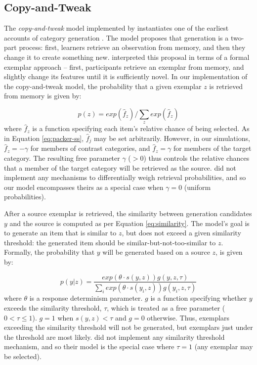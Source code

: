 \documentclass[10pt,letterpaper]{article}
\begin{document}
\subsection{Copy-and-Tweak}

The \textit{copy-and-tweak} model implemented by \citet{jern2013probabilistic} instantiates one of the earliest accounts of category generation \citep[see][]{ward2002role,ward1995s}. The model proposes that generation is a two-part process: first, learners retrieve an observation from memory, and then they change it to create something new. \citet{jern2013probabilistic} interpreted this proposal in terms of a formal exemplar approach -- first, participants retrieve an exemplar from memory, and slightly change its features until it is sufficiently novel. In our implementation of the copy-and-tweak model, the probability that a given exemplar $z$ is retrieved from memory is given by: 

\begin{equation}
p(z) = exp(\hat{f}_z) / \sum_z{ exp(\hat{f}_z) }
\end{equation}
%
where $\hat{f}_z$ is a function specifying each item's relative chance of being selected. As in Equation \ref{eq:packer-ss}, $\hat{f}_j$ may be set arbitrarily. However, in our simulations, $\hat{f}_z = -\gamma$ for members of contrast categories, and $\hat{f}_z = \gamma$ for members of the target category. The resulting free parameter $\gamma$ ($>0$) thus controls the relative chances that a member of the target category will be retrieved as the source. \citet{jern2013probabilistic} did not implement any mechanisms to differentially weigh retrieval probabilities, and so our model encompasses theirs as a special case when $\gamma = 0$ (uniform probabilities).

After a source exemplar is retrieved, the similarity between generation candidates $y$ and the source is computed as per Equation \ref{eq:similarity}. The model's goal is to generate an item that is similar to $z$, but does not exceed a given similarity threshold: the generated item should be similar-but-not-too-similar to $z$. Formally, the probability that $y$ will be generated based on a source $z$, is given by:

\begin{equation}
    p(y|z)  = \dfrac
    { exp(\theta \cdot s(y,z)) g(y,z,\tau)}
    {\sum_i{exp(\theta \cdot s(y_i,z)) g(y_i,z,\tau)}} 
\end{equation}
% 
where $\theta$ is a response determinism parameter. $g$ is a function specifying whether $y$ exceeds the similarity threshold, $\tau$, which is treated as a free parameter ($0<\tau\leq1$). $g = 1$ when $s(y,z) < \tau$ and $g = 0$ otherwise. Thus, exemplars exceeding the similarity threshold will not be generated, but exemplars just under the threshold are most likely. \citet{jern2013probabilistic} did not implement any similarity threshold mechanism, and so their model is the special case where $\tau = 1$ (any exemplar may be selected).
\end{document}
